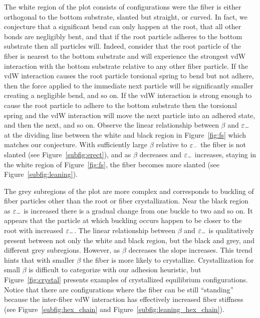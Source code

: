 The white region of the plot consists of configurations were the fiber is either orthogonal to the bottom substrate, slanted but straight, or curved. In fact, we conjecture that a significant bend can only happen at the root, that all other bonds are negligibly bent, and that if the root particle adheres to the bottom substrate then all particles will. Indeed, consider that the root particle of the fiber is nearest to the bottom substrate and will experience the strongest vdW interaction with the bottom substrate relative to any other fiber particle. If the vdW interaction causes the root particle torsional spring to bend but not adhere, then the force applied to the immediate next particle will be significantly smaller creating a negligible bend, and so on. If the vdW interaction is strong enough to cause the root particle to adhere to the bottom substrate then the torsional spring and the vdW interaction will move the next particle into an adhered state, and then the next, and so on. Observe the linear relationship between $\beta$ and $\varepsilon_-$ at the dividing line between the white and black region in Figure~\ref{fig:fs} which matches our conjecture. With sufficiently large $\beta$ relative to $\varepsilon_-$ the fiber is not slanted (see Figure~\ref{subfig:erect}), and as $\beta$ decreases and $\varepsilon_-$ increases, staying in the white region of Figure~\ref{fig:fs}, the fiber becomes more slanted (see Figure~\ref{subfig:leaning}).

The grey subregions of the plot are more complex and corresponds to buckling of fiber particles other than the root or fiber crystallization. Near the black region as $\varepsilon_-$ is increased there is a gradual change from one buckle to two and so on. It appears that the particle at which buckling occurs happen to be closer to the root with increased $\varepsilon_-$. The linear relationship between $\beta$ and $\varepsilon_-$ is qualitatively present between not only the white and black region, but the black and grey, and different grey subregions. However, as $\beta$ decreases the slope increases. This trend hints that with smaller $\beta$ the fiber is more likely to crystallize. Crystallization for small $\beta$ is difficult to categorize with our adhesion heuristic, but Figure~\ref{fig:crystal} presents examples of  crystallized equilibrium configurations. Notice that there are configurations where the fiber can be still ``standing'' because the inter-fiber vdW interaction has effectively increased fiber stiffness (see Figure~\ref{subfig:hex_chain} and Figure~\ref{subfig:leaning_hex_chain}).

